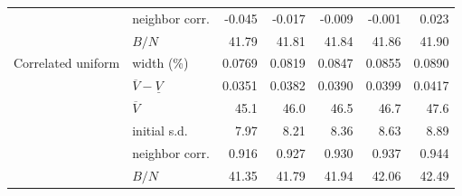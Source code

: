\begin{table}[!tbp]
\begin{tabular}{llrrrrr}
 & neighbor corr. & -0.045 & -0.017 & -0.009 & -0.001 & 0.023\\
 & $B/N$ & 41.79 & 41.81 & 41.84 & 41.86 & 41.90\\
\addlinespace[3pt]
Correlated uniform & width (\%) & 0.0769 & 0.0819 & 0.0847 & 0.0855 & 0.0890\\
 & $\overline V-\underline V$ & 0.0351 & 0.0382 & 0.0390 & 0.0399 & 0.0417\\
 & $\overline V$ & 45.1 & 46.0 & 46.5 & 46.7 & 47.6\\
 & initial s.d. & 7.97 & 8.21 & 8.36 & 8.63 & 8.89\\
 & neighbor corr. & 0.916 & 0.927 & 0.930 & 0.937 & 0.944\\
 & $B/N$ & 41.35 & 41.79 & 41.94 & 42.06 & 42.49\\
\bottomrule
\end{tabular}
\end{table}
